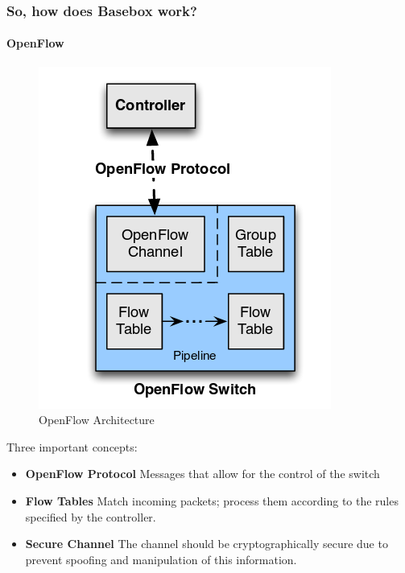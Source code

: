 \documentclass[11pt]{beamer}
\begin{document}
\begin{frame}
\frametitle{So, how does Basebox work?}
\framesubtitle{OpenFlow}

\begin{minipage}[t]{0.48\linewidth}
\begin{figure}
\includegraphics[scale=.2]{open_flow_switch_pipeline.png} 
\caption{OpenFlow Architecture}
\end{figure}
\end{minipage}\hfill
\begin{minipage}[t]{0.48\linewidth}

Three important concepts:

\begin {itemize}
	\item \textbf {OpenFlow Protocol} Messages that allow for the control of the switch
    \item \textbf {Flow Tables} Match incoming packets; process them according to the rules specified by the controller.
    \item \textbf {Secure Channel} The channel should be cryptographically secure due to prevent spoofing and manipulation of this information.
\end {itemize}
\end{minipage}\hfill


\end{frame}
\end{document}
